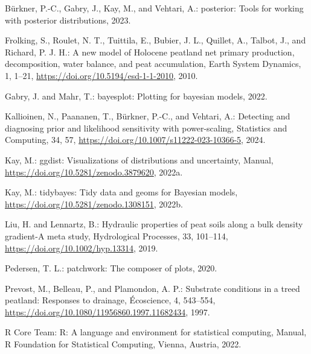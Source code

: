 \documentclass[
  12pt,
]{article}
\newlength{\cslhangindent}
\newlength{\cslentryspacingunit} %
\newenvironment{CSLReferences}[2] %
 {%
  \setlength{\parindent}{0pt}
  \ifodd #1
  \let\oldpar\par
  \def\par{\hangindent=\cslhangindent\oldpar}
  \fi
  \setlength{\parskip}{#2\cslentryspacingunit}
 }%
 {}
\begin{document}
\hypertarget{refs}{}
\begin{CSLReferences}{0}{0}
\leavevmode{}%
Bürkner, P.-C., Gabry, J., Kay, M., and Vehtari, A.: {posterior}: {Tools} for working with posterior distributions, 2023.

\leavevmode{}%
Frolking, S., Roulet, N. T., Tuittila, E., Bubier, J. L., Quillet, A., Talbot, J., and Richard, P. J. H.: A new model of {Holocene} peatland net primary production, decomposition, water balance, and peat accumulation, Earth System Dynamics, 1, 1--21, \url{https://doi.org/10.5194/esd-1-1-2010}, 2010.

\leavevmode{}%
Gabry, J. and Mahr, T.: {bayesplot}: {Plotting} for bayesian models, 2022.

\leavevmode{}%
Kallioinen, N., Paananen, T., Bürkner, P.-C., and Vehtari, A.: Detecting and diagnosing prior and likelihood sensitivity with power-scaling, Statistics and Computing, 34, 57, \url{https://doi.org/10.1007/s11222-023-10366-5}, 2024.

\leavevmode{}%
Kay, M.: {ggdist}: {Visualizations} of distributions and uncertainty, Manual, \url{https://doi.org/10.5281/zenodo.3879620}, 2022a.

\leavevmode{}%
Kay, M.: {tidybayes}: {Tidy} data and geoms for {Bayesian} models, \url{https://doi.org/10.5281/zenodo.1308151}, 2022b.

\leavevmode{}%
Liu, H. and Lennartz, B.: Hydraulic properties of peat soils along a bulk density gradient-{A} meta study, Hydrological Processes, 33, 101--114, \url{https://doi.org/10.1002/hyp.13314}, 2019.

\leavevmode{}%
Pedersen, T. L.: {patchwork}: {The} composer of plots, 2020.

\leavevmode{}%
Prevost, M., Belleau, P., and Plamondon, A. P.: Substrate conditions in a treed peatland: {Responses} to drainage, {É}coscience, 4, 543--554, \url{https://doi.org/10.1080/11956860.1997.11682434}, 1997.

\leavevmode{}%
R Core Team: R: {A} language and environment for statistical computing, Manual, R Foundation for Statistical Computing, Vienna, Austria, 2022.


\end{CSLReferences}
\end{document}
